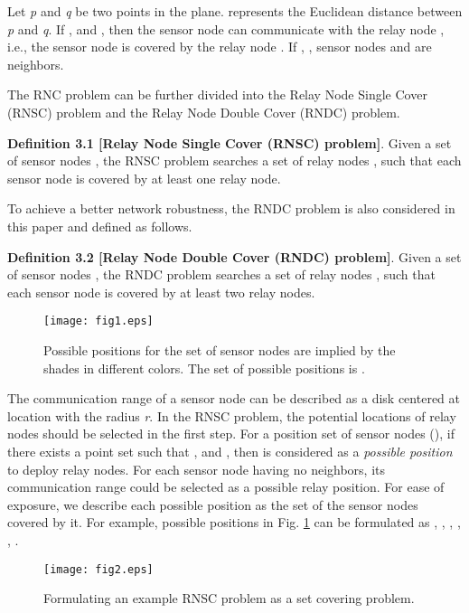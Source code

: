 \documentclass[journal]{IEEEtran}
\begin{document}
Let \emph{p} and \emph{q} be two points in the plane.  represents the Euclidean distance between \emph{p} and \emph{q}. If ,  and , then the sensor node  can communicate with the relay node , i.e., the sensor node  is covered by the relay node . If , , sensor nodes  and  are neighbors.

The RNC problem can be further divided into the Relay Node Single Cover (RNSC) problem and the Relay Node Double Cover (RNDC) problem.

\textbf{Definition 3.1 [Relay Node Single Cover (RNSC) problem]}. Given a set of sensor nodes , the RNSC problem searches a
set of relay nodes , such that each sensor node   is covered by at least one relay node.

To achieve a better network robustness, the RNDC problem is also considered in this paper and defined as follows.

\textbf{Definition 3.2 [Relay Node Double Cover (RNDC) problem]}. Given a set of sensor nodes , the RNDC problem searches a
set of relay nodes , such that each sensor node   is covered by at least two relay nodes.

\begin{figure}
\begin{center}
\texttt{[image: fig1.eps]}    \caption{Possible positions for the set of sensor nodes  are implied by the shades in different colors. The set of possible positions is .}
\label{fig1}                                 \end{center}                                 \end{figure}

The communication range of a sensor node  can be described as a disk centered at location  with the radius \emph{r}. In the RNSC problem, the potential locations of relay nodes should be selected in the first step. For a position set
 of sensor nodes  (), if there exists a point set  such that ,  and , then  is considered as a \emph{possible position} to deploy relay nodes. For each sensor node having no neighbors, its communication range could be selected as a possible relay position. For ease of exposure, we describe each possible position as the set of the sensor nodes covered by it. For example, possible positions in Fig. \ref{fig1} can be formulated as , , , , , .

\begin{figure}
\begin{center}
\texttt{[image: fig2.eps]}    \caption{Formulating an example RNSC problem as a set covering problem.}
\label{fig2}                                 \end{center}                                 \end{figure}
\end{document}
